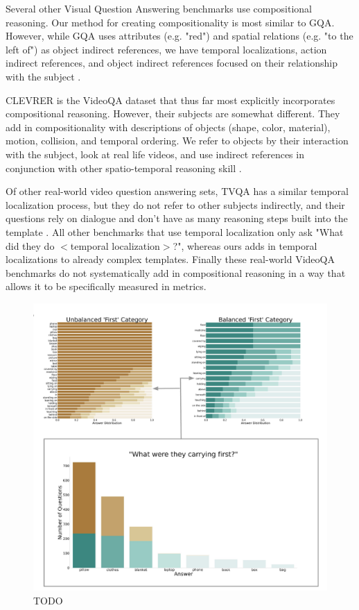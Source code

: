 \documentclass[10pt,twocolumn,letterpaper]{article}
\begin{document}
Several other Visual Question Answering benchmarks use compositional reasoning. Our method for creating compositionality is most similar to GQA. However, while GQA uses attributes (e.g. "red") and spatial relations (e.g. "to the left of") as object indirect references, we have temporal localizations, action indirect references, and object indirect references focused on their relationship with the subject \cite{hudson2019gqa}. 

CLEVRER is the VideoQA dataset that thus far most explicitly incorporates compositional reasoning. However, their subjects are somewhat different. They add in compositionality with descriptions of objects (shape, color, material), motion, collision, and temporal ordering. We refer to objects by their interaction with the subject, look at real life videos, and use indirect references in conjunction with other spatio-temporal reasoning skill \cite{yi2019clevrer}.

Of other real-world video question answering sets, TVQA has a similar temporal localization process, but they do not refer to other subjects indirectly, and their questions rely on dialogue and don't have as many reasoning steps built into the template \cite{lei2018tvqa}. All other benchmarks that use temporal localization only ask "What did they do $<$temporal localization$>$?", whereas ours adds in temporal localizations to already complex templates. Finally these real-world VideoQA benchmarks do not systematically add in compositional reasoning in a way that allows it to be specifically measured in metrics. 



\begin{figure}[t]
    \centering
    \includegraphics[width=0.95\linewidth]{figures/balance first.pdf}
    \caption{TODO}
    \label{fig:balancefirst}
\end{figure}
\end{document}
